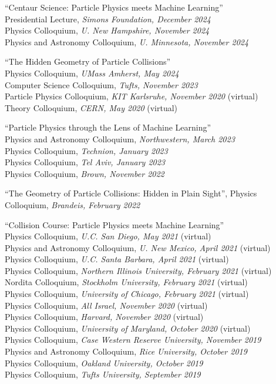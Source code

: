 \bbl

\item ``Centaur Science:  Particle Physics meets Machine Learning''
\\ Presidential Lecture, \emph{Simons Foundation, December 2024}
\\ Physics Colloquium, \emph{U. New Hampshire, November 2024}
\\ Physics and Astronomy Colloquium, \emph{U. Minnesota, November 2024}

\item ``The Hidden Geometry of Particle Collisions''
\\ Physics Colloquium, \emph{UMass Amherst, May 2024}
\\ Computer Science Colloquium, \emph{Tufts, November 2023}
\\ Particle Physics Colloquium, \emph{KIT Karlsruhe, November 2020} (virtual)
\\ Theory Colloquium, \emph{CERN, May 2020} (virtual)

\item ``Particle Physics through the Lens of Machine Learning''
\\ Physics and Astronomy Colloquium, \emph{Northwestern, March 2023}
\\ Physics Colloquium, \emph{Technion, January 2023}
\\ Physics Colloquium, \emph{Tel Aviv, January 2023}
\\ Physics Colloquium, \emph{Brown, November 2022}

\item ``The Geometry of Particle Collisions: Hidden in Plain Sight'', Physics Colloquium, \emph{Brandeis, February 2022}

\item ``Collision Course:  Particle Physics meets Machine Learning''
\\ Physics Colloquium, \emph{U.C. San Diego, May 2021} (virtual)
\\ Physics and Astronomy Colloquium, \emph{U. New Mexico, April 2021} (virtual)
\\ Physics Colloquium, \emph{U.C. Santa Barbara, April 2021} (virtual)
\\ Physics Colloquium, \emph{Northern Illinois University, February 2021} (virtual)
\\ Nordita Colloquium, \emph{Stockholm University, February 2021} (virtual)
\\ Physics Colloquium, \emph{University of Chicago, February 2021} (virtual)
\\ Physics Colloquium, \emph{All Israel, November 2020} (virtual)
\\ Physics Colloquium, \emph{Harvard, November 2020} (virtual)
\\ Physics Colloquium, \emph{University of Maryland, October 2020} (virtual)
\\ Physics Colloquium, \emph{Case Western Reserve University, November 2019}
\\ Physics and Astronomy Colloquium, \emph{Rice University, October 2019}
\\ Physics Colloquium, \emph{Oakland University, October 2019}
\\ Physics Colloquium, \emph{Tufts University, September 2019}

